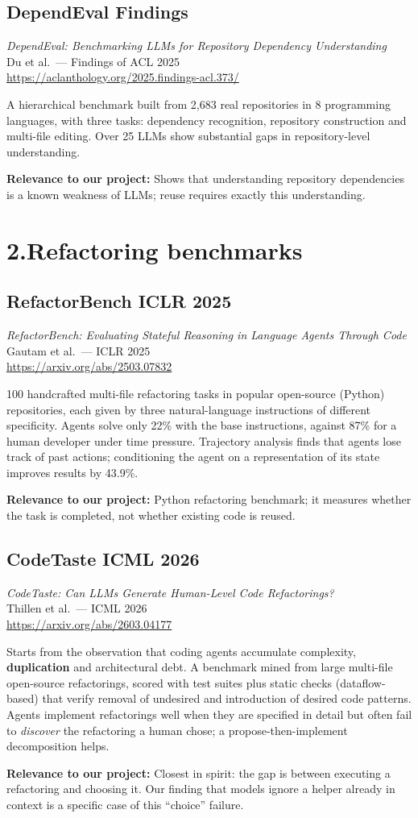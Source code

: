 \documentclass[11pt,a4paper]{article}
\newcommand{\tagbox}[2]{\colorbox{#1!15}{\textcolor{#1!80!black}{\footnotesize\textbf{#2}}}}
\newcommand{\paper}[6]{%
  \subsection*{#1 \hfill #4}
  \textit{#2}\\
  {\small #3}\\
  {\small\url{#5}}\par
  #6
  \vspace{0.4em}}
\newcommand{\why}[1]{\par\textbf{Relevance to our project:} #1}
\begin{document}
\paper{DependEval}
{DependEval: Benchmarking LLMs for Repository Dependency Understanding}
{Du et al.\ --- Findings of ACL 2025}
{\tagbox{findings}{Findings}}
{https://aclanthology.org/2025.findings-acl.373/}
{A hierarchical benchmark built from 2,683 real repositories in 8 programming languages, with three
tasks: dependency recognition, repository construction and multi-file editing. Over 25 LLMs show
substantial gaps in repository-level understanding.
\why{Shows that understanding repository dependencies is a known weakness of LLMs; reuse requires exactly
this understanding.}}

\section{2.\quad Refactoring benchmarks}

\paper{RefactorBench}
{RefactorBench: Evaluating Stateful Reasoning in Language Agents Through Code}
{Gautam et al.\ --- ICLR 2025}
{\tagbox{main}{ICLR 2025}}
{https://arxiv.org/abs/2503.07832}
{100 handcrafted multi-file refactoring tasks in popular open-source (Python) repositories, each given
by three natural-language instructions of different specificity. Agents solve only 22\% with the base
instructions, against 87\% for a human developer under time pressure. Trajectory analysis finds that
agents lose track of past actions; conditioning the agent on a representation of its state improves
results by 43.9\%.
\why{Python refactoring benchmark; it measures whether the task is completed, not whether existing code
is reused.}}

\paper{CodeTaste}
{CodeTaste: Can LLMs Generate Human-Level Code Refactorings?}
{Thillen et al.\ --- ICML 2026}
{\tagbox{main}{ICML 2026}}
{https://arxiv.org/abs/2603.04177}
{Starts from the observation that coding agents accumulate complexity, \textbf{duplication} and
architectural debt. A benchmark mined from large multi-file open-source refactorings, scored with test
suites plus static checks (dataflow-based) that verify removal of undesired and introduction of desired
code patterns. Agents implement refactorings well when they are specified in detail but often fail to
\emph{discover} the refactoring a human chose; a propose-then-implement decomposition helps.
\why{Closest in spirit: the gap is between executing a refactoring and choosing it. Our finding that
models ignore a helper already in context is a specific case of this ``choice'' failure.}}
\end{document}
